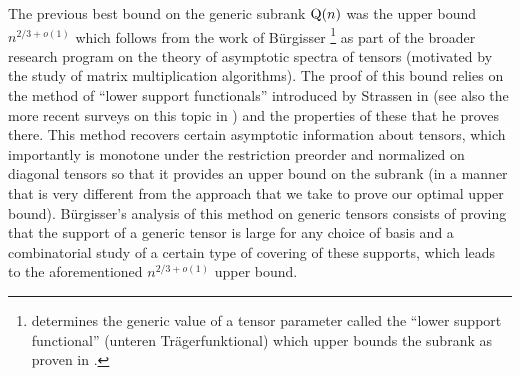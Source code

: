 \documentclass[10pt,a4paper]{article}
\theoremstyle{definition}
\theoremstyle{remark}
\newcommand{\gensubrank}{{\rm Q}}
\begin{document}
The previous best bound on the generic subrank $\gensubrank(n)$ was the upper bound $n^{2/3 + o(1)}$ which follows from the work of Bürgisser \cite[Satz~2.8]{burg}\footnote{\cite[Satz~2.8]{burg} determines the generic value of a tensor parameter called the ``lower support functional'' (unteren  Trägerfunktional) which upper bounds the subrank as proven in \cite{strassen1991degeneration}.} as part of the broader research program on the theory of asymptotic spectra of tensors (motivated by the study of matrix multiplication algorithms). The proof of this bound relies on the method of ``lower support functionals'' introduced by Strassen in \cite{strassen1991degeneration} (see also the more recent surveys on this topic in \cite{christandl2017universalproc,phd,WZ}) and the properties of these that he proves there. This method recovers certain asymptotic information about tensors, which importantly is monotone under the restriction preorder and normalized on diagonal tensors so that it provides an upper bound on the subrank (in a manner that is very different from the approach that we take to prove our optimal upper bound). Bürgisser's analysis of this method on generic tensors consists of proving that the support of a generic tensor is large for any choice of basis and a combinatorial study of a certain type of covering of these supports, which leads to the aforementioned $n^{2/3 + o(1)}$ upper bound.
\end{document}

